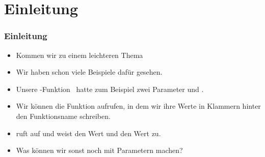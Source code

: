 \documentclass[aspectratio=169,mathserif,notheorems]{beamer}%
\subtitle{29.~Funktionsargumente}%
\begin{document}
%
%
\startPresentation%
%
\section{Einleitung}%
\begin{frame}%
\frametitle{Einleitung}%
\begin{itemize}%
\item Kommen wir zu einem leichteren Thema%
%
\item<2-> Wir haben schon viele Beispiele dafür gesehen.%
%
\item<3-> Unsere -Funktion \DEzB\ hatte zum Beispiel zwei Parameter  und .%
%
\item<4-> Wir können die Funktion aufrufen, in dem wir ihre Werte in Klammern hinter den Funktionsname schreiben.%
%
\item<5->  ruft  auf und weist  den Wert  und  den Wert  zu.%
%
\item<6-> Was können wir sonst noch mit Parametern machen?%
\end{itemize}%
\end{frame}%
%
\end{document}
